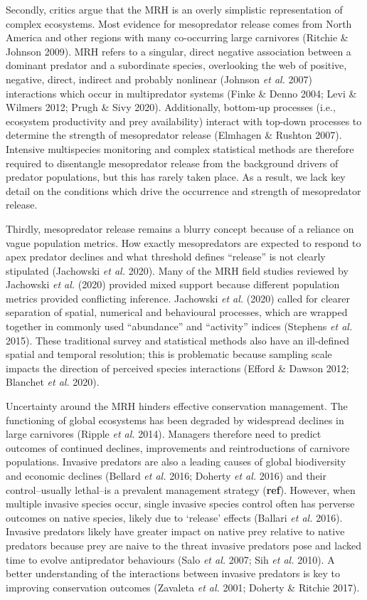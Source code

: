 \documentclass[11pt,a4paper,titlepage,twoside,openright]{style/unimelbthesis}
\begin{document}
\begin{mainmatter}
Secondly, critics argue that the MRH is an overly simplistic representation of complex ecosystems. Most evidence for mesopredator release comes from North America and other regions with many co-occurring large carnivores (Ritchie \& Johnson 2009). MRH refers to a singular, direct negative association between a dominant predator and a subordinate species, overlooking the web of positive, negative, direct, indirect and probably nonlinear (Johnson \emph{et al.} 2007) interactions which occur in multipredator systems (Finke \& Denno 2004; Levi \& Wilmers 2012; Prugh \& Sivy 2020). Additionally, bottom-up processes (i.e., ecosystem productivity and prey availability) interact with top-down processes to determine the strength of mesopredator release (Elmhagen \& Rushton 2007). Intensive multispecies monitoring and complex statistical methods are therefore required to disentangle mesopredator release from the background drivers of predator populations, but this has rarely taken place. As a result, we lack key detail on the conditions which drive the occurrence and strength of mesopredator release.

Thirdly, mesopredator release remains a blurry concept because of a reliance on vague population metrics. How exactly mesopredators are expected to respond to apex predator declines and what threshold defines ``release'' is not clearly stipulated (Jachowski \emph{et al.} 2020). Many of the MRH field studies reviewed by Jachowski \emph{et al.} (2020) provided mixed support because different population metrics provided conflicting inference. Jachowski \emph{et al.} (2020) called for clearer separation of spatial, numerical and behavioural processes, which are wrapped together in commonly used ``abundance'' and ``activity'' indices (Stephens \emph{et al.} 2015). These traditional survey and statistical methods also have an ill-defined spatial and temporal resolution; this is problematic because sampling scale impacts the direction of perceived species interactions (Efford \& Dawson 2012; Blanchet \emph{et al.} 2020).

Uncertainty around the MRH hinders effective conservation management. The functioning of global ecosystems has been degraded by widespread declines in large carnivores (Ripple \emph{et al.} 2014). Managers therefore need to predict outcomes of continued declines, improvements and reintroductions of carnivore populations. Invasive predators are also a leading causes of global biodiversity and economic declines (Bellard \emph{et al.} 2016; Doherty \emph{et al.} 2016) and their control--usually lethal--is a prevalent management strategy (\textbf{ref}). However, when multiple invasive species occur, single invasive species control often has perverse outcomes on native species, likely due to `release' effects (Ballari \emph{et al.} 2016). Invasive predators likely have greater impact on native prey relative to native predators because prey are naive to the threat invasive predators pose and lacked time to evolve antipredator behaviours (Salo \emph{et al.} 2007; Sih \emph{et al.} 2010). A better understanding of the interactions between invasive predators is key to improving conservation outcomes (Zavaleta \emph{et al.} 2001; Doherty \& Ritchie 2017).


\end{mainmatter}
\end{document}
